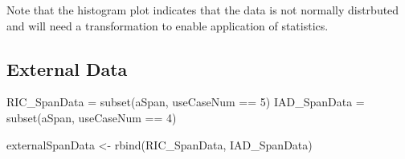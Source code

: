 \documentclass[
  letterpaper,
  DIV=11,
  numbers=noendperiod]{scrartcl}
\newenvironment{Shaded}{\begin{snugshade}}{\end{snugshade}}
\newcommand{\CommentTok}[1]{\textcolor[rgb]{0.37,0.37,0.37}{#1}}
\newcommand{\DecValTok}[1]{\textcolor[rgb]{0.68,0.00,0.00}{#1}}
\newcommand{\FunctionTok}[1]{\textcolor[rgb]{0.28,0.35,0.67}{#1}}
\newcommand{\NormalTok}[1]{\textcolor[rgb]{0.00,0.23,0.31}{#1}}
\newcommand{\OtherTok}[1]{\textcolor[rgb]{0.00,0.23,0.31}{#1}}
\newcommand{\SpecialCharTok}[1]{\textcolor[rgb]{0.37,0.37,0.37}{#1}}
\begin{document}
Note that the histogram plot indicates that the data is not normally
distrbuted and will need a transformation to enable application of
statistics.

\hypertarget{external-data}{%
\subsection{External Data}\label{external-data}}

\begin{Shaded}
\begin{Highlighting}[]
\NormalTok{RIC\_SpanData }\OtherTok{=} \FunctionTok{subset}\NormalTok{(aSpan, useCaseNum }\SpecialCharTok{==} \DecValTok{5}\NormalTok{)}
\NormalTok{IAD\_SpanData }\OtherTok{=} \FunctionTok{subset}\NormalTok{(aSpan, useCaseNum }\SpecialCharTok{==} \DecValTok{4}\NormalTok{)}

\NormalTok{externalSpanData }\OtherTok{\textless{}{-}} \FunctionTok{rbind}\NormalTok{(RIC\_SpanData, IAD\_SpanData)}
\end{Highlighting}
\end{Shaded}

\begin{Shaded}
\end{Shaded}

\begin{Shaded}
\end{Shaded}
\end{document}
